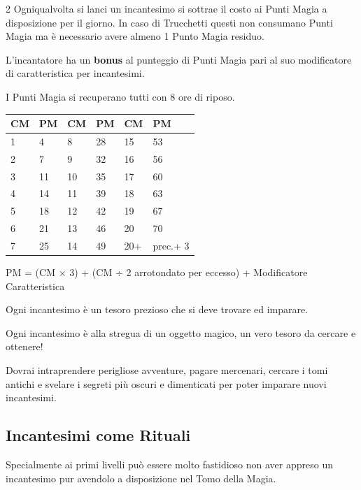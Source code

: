 \begin{multicols}{2}
Ogniqualvolta si lanci un incantesimo si sottrae il costo ai Punti Magia a disposizione per il giorno.
In caso di Trucchetti questi non consumano Punti Magia ma è necessario avere almeno 1 Punto Magia residuo.

L'incantatore ha un \textbf{bonus} al punteggio di Punti Magia pari al suo modificatore di caratteristica per incantesimi.

I Punti Magia si recuperano tutti con 8 ore di riposo. 


\medskip

\noindent\begin{tabularx}{\linewidth}{XX|XX|XX}
	\toprule
 \rowcolor{gray!20}\textbf{CM} & \textbf{PM}&\textbf{CM} & \textbf{PM}&\textbf{CM} & \textbf{PM}\\
	\toprule
	1&	4  &	8&	28&	15&	53\\
 \rowcolor{gray!20}2&	7  &	9&	32&	16&	56\\
	3&	11 &	10&	35&	17&	60\\
 \rowcolor{gray!20}4&	14 &	11&	39&	18&	63\\
	5&	18 &	12&	42&	19&	67\\
 \rowcolor{gray!20}6&	21 &	13&	46&	20&	70\\
	7&	25 & 	14&	49&	20+&	prec.+ 3
\end{tabularx}

PM = (CM × 3) + (CM ÷ 2 arrotondato per eccesso) + Modificatore Caratteristica



\begin{giocatore}
	Ogni incantesimo è un tesoro prezioso che si deve trovare ed imparare.

	Ogni incantesimo è alla stregua di un oggetto magico, un vero tesoro da cercare e ottenere!

	Dovrai intraprendere perigliose avventure, pagare mercenari, cercare i tomi antichi e svelare i segreti più oscuri e dimenticati per poter imparare nuovi incantesimi.
\end{giocatore}


\subsection*{Incantesimi come Rituali}

Specialmente ai primi livelli può essere molto fastidioso non aver appreso un incantesimo pur avendolo a disposizione nel Tomo della Magia.


\end{multicols}
